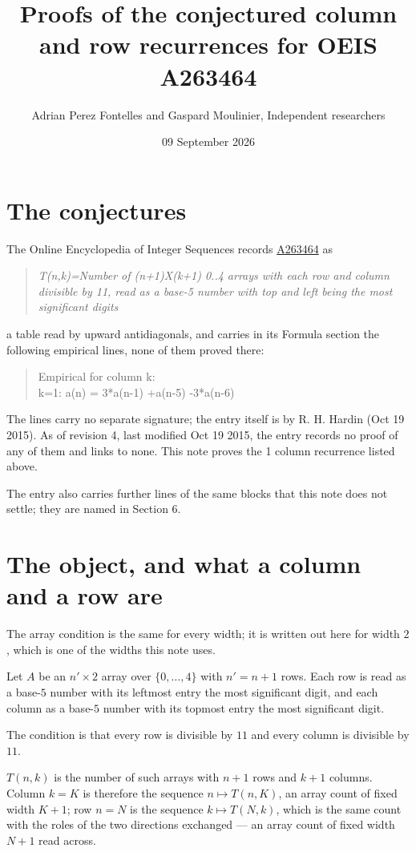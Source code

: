 \documentclass[11pt]{article}
\title{Proofs of the conjectured column and row recurrences for OEIS A263464}
\author{Adrian Perez Fontelles and Gaspard Moulinier, Independent researchers}
\date{09 September 2026}
\theoremstyle{definition}
\begin{document}
\maketitle
\section{The conjectures}

The Online Encyclopedia of Integer Sequences records \href{https://oeis.org/A263464}{A263464} as

\begin{quote}\itshape T(n,k)=Number of (n+1)X(k+1) 0..4 arrays with each row and column divisible by 11, read as a base-5 number with top and left being the most significant digits\end{quote}

a table read by upward antidiagonals, and carries in its Formula section the following empirical lines, none of them proved there:

\begin{quote}\ttfamily Empirical for column k:\\
k=1: a(n) = 3*a(n-1) +a(n-5) -3*a(n-6)\end{quote}

The lines carry no separate signature; the entry itself is by R. H. Hardin (Oct 19 2015). As of revision 4, last modified Oct 19 2015, the entry records no proof of any of them and links to none. This note proves the 1 column recurrence listed above.

The entry also carries further lines of the same blocks that this note does not settle; they are named in Section 6.

\section{The object, and what a column and a row are}

The array condition is the same for every width; it is written out here for width $2$, which is one of the widths this note uses.

Let $A$ be an $n' \times 2$ array over $\{0,\dots,4\}$ with $n' = n + 1$ rows. Each row is read as a base-$5$ number with its leftmost entry the most significant digit, and each column as a base-$5$ number with its topmost entry the most significant digit.

The condition is that every row is divisible by $11$ and every column is divisible by $11$.

$T(n,k)$ is the number of such arrays with $n + 1$ rows and $k + 1$ columns. Column $k = K$ is therefore the sequence $n \mapsto T(n,K)$, an array count of fixed width $K + 1$; row $n = N$ is the sequence $k \mapsto T(N,k)$, which is the same count with the roles of the two directions exchanged --- an array count of fixed width $N + 1$ read across.
\end{document}
